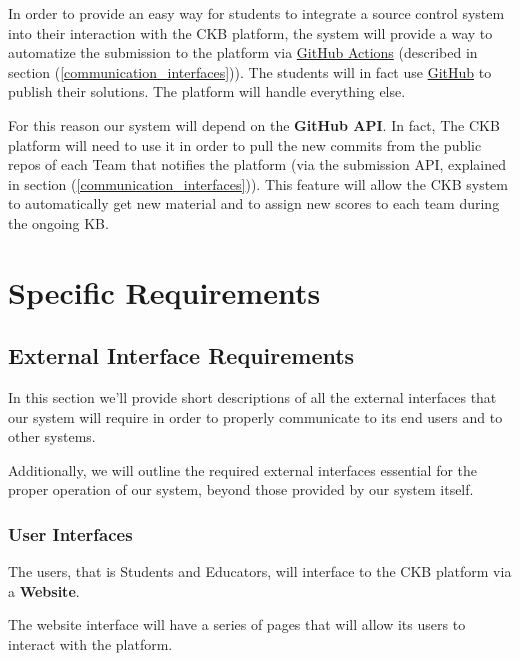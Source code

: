\documentclass[11pt]{report}
\begin{document}
In order to provide an easy way for students to integrate a source control system into their
interaction with the CKB platform, the system will provide a way to automatize the submission 
to the platform via \href{https://github.com/features/actions}{GitHub Actions} (described in section (\ref{communication_interfaces})).
The students will in fact use \href{https://github.com/}{GitHub} to publish their solutions.
The platform will handle everything else.

For this reason our system will depend on the \textbf{GitHub API}.
In fact, The CKB platform will need to use it in order to pull the new commits from the public repos of 
each Team that notifies the platform (via the submission API, explained in section (\ref{communication_interfaces})).
This feature will allow the CKB system to automatically get new material and to assign new 
scores to each team during the ongoing KB\@.


\chapter{Specific Requirements}

\section{External Interface Requirements}
In this section we'll provide short descriptions of all the external interfaces that our system will require in order to properly communicate to its end users and to other systems.

Additionally, we will outline the required external interfaces essential for the proper operation of our system, beyond those provided by our system itself.

\subsection{User Interfaces}
The users, that is Students and Educators, will interface to the CKB platform via a \textbf{Website}.

The website interface will have a series of pages that will allow its users to interact with the platform.
\end{document}
